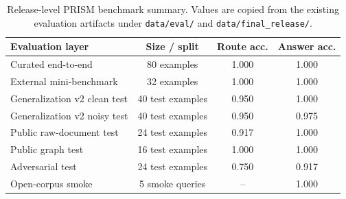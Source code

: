 \begin{table}[t]
\centering
\small
\begin{tabular}{lccc}
\toprule
\textbf{Evaluation layer} & \textbf{Size / split} & \textbf{Route acc.} & \textbf{Answer acc.} \\
\midrule
Curated end-to-end & 80 examples & 1.000 & 1.000 \\
External mini-benchmark & 32 examples & 1.000 & 1.000 \\
Generalization v2 clean test & 40 test examples & 0.950 & 1.000 \\
Generalization v2 noisy test & 40 test examples & 0.950 & 0.975 \\
Public raw-document test & 24 test examples & 0.917 & 1.000 \\
Public graph test & 16 test examples & 1.000 & 1.000 \\
Adversarial test & 24 test examples & 0.750 & 0.917 \\
Open-corpus smoke & 5 smoke queries & -- & 1.000 \\
\bottomrule
\end{tabular}
\caption{Release-level PRISM benchmark summary. Values are copied from the existing evaluation artifacts under \texttt{data/eval/} and \texttt{data/final\_release/}.}
\label{tab:benchmarks}
\end{table}
